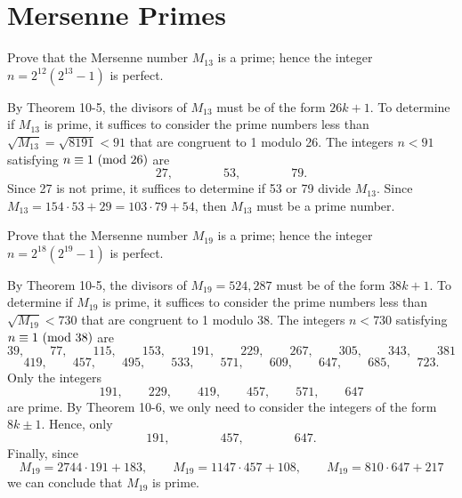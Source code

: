 \section{Mersenne Primes}

\begin{exercise}
    Prove that the Mersenne number $M_{13}$ is a prime; hence the integer $n = 2^{12}(2^{13} - 1)$ is perfect.  \\
\end{exercise}

\begin{solution}
    By Theorem 10-5, the divisors of $M_{13}$ must be of the form $26k + 1$. To determine if $M_{13}$ is prime, it suffices to consider the prime numbers less than $\sqrt{M_{13}} = \sqrt{8191} < 91$ that are congruent to 1 modulo 26. The integers $n < 91$ satisfying $n \equiv 1 \ (\mathrm{mod}\ 26)$ are
    $$27, \qquad \qquad 53, \qquad \qquad 79.$$
    Since 27 is not prime, it suffices to determine if 53 or 79 divide $M_{13}$. Since $M_{13} = 154\cdot 53 + 29 = 103\cdot 79 + 54$, then $M_{13}$ must be a prime number. \\
\end{solution}

\begin{exercise}
    Prove that the Mersenne number $M_{19}$ is a prime; hence the integer $n = 2^{18}(2^{19} - 1)$ is perfect.  \\
\end{exercise}

\begin{solution}
    By Theorem 10-5, the divisors of $M_{19} = 524,287$ must be of the form $38k + 1$. To determine if $M_{19}$ is prime, it suffices to consider the prime numbers less than $\sqrt{M_{19}} < 730$ that are congruent to 1 modulo 38. The integers $n < 730$ satisfying $n \equiv 1 \ (\mathrm{mod}\ 38)$ are
    $$39, \qquad 77, \qquad 115, \qquad 153, \qquad 191, \qquad 229, \qquad 267, \qquad 305, \qquad 343, \qquad 381$$
    $$419, \qquad 457, \qquad 495, \qquad 533, \qquad 571, \qquad 609, \qquad 647, \qquad 685, \qquad 723.$$
    Only the integers
    $$191, \qquad 229, \qquad 419, \qquad 457, \qquad 571, \qquad 647$$
    are prime. By Theorem 10-6, we only need to consider the integers of the form $8k \pm 1$. Hence, only
    $$191, \qquad \qquad 457, \qquad \qquad 647.$$
    Finally, since
    $$M_{19} = 2744\cdot 191 + 183, \qquad M_{19} = 1147\cdot 457 + 108, \qquad M_{19} = 810\cdot 647 + 217$$
    we can conclude that $M_{19}$ is prime. \\
\end{solution}

